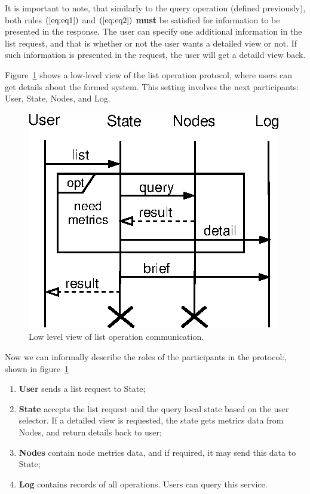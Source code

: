 \noindent
It is important to note, that similarly to the query operation (defined previously), both rules $(\ref{eq:eq1})$ and $(\ref{eq:eq2})$ \textbf{must} be satisfied for information to be presented in the response. The user can specify one additional information in the list request, and that is whether or not the user wants a detailed view or not. If such information is presented in the request, the user will get a detaild view back. 

Figure~\ref{fig:fig8} shows a low-level view of the list operation protocol, where users can get details about the formed system. This setting involves the next participants: User, State, Nodes, and Log. 

\begin{figure}[!htbp]
	\begin{center}
		\includegraphics[scale=0.9]{images/FIG4}
	\end{center}
	\vspace{-0.4cm}
	\caption{Low level view of list operation communication.}
	\label{fig:fig8}
\end{figure}

\noindent
Now we can informally describe the roles of the participants in the protocol:\label{list_protocol_informal_description}, shown in figure~\ref{fig:fig8}

\begin{enumerate}[start=1,label={(\bfseries \arabic*)}]
	\item \textbf{User} sends a list request to State;
	\item \textbf{State} accepts the list request and the query local state based on the user selector. If a detailed view is requested, the state gets metrics data from Nodes, and return details back to user;
	\item \textbf{Nodes} contain node metrics data, and if required, it may send this data to State;
	\item \textbf{Log} contains records of all operations. Users can query this service.
\end{enumerate}

